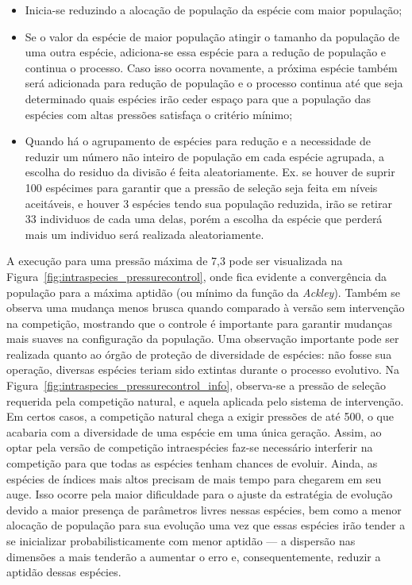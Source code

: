 \begin{itemize}
\item Inicia-se reduzindo a alocação de população da espécie com maior
população;
\item Se o valor da espécie de maior população atingir o tamanho da
população de uma outra espécie, adiciona-se essa espécie para a
redução de população e continua o processo. Caso isso ocorra
novamente, a próxima espécie também será adicionada para redução de
população e o processo continua até que seja determinado quais
espécies irão ceder espaço para que a população das espécies com altas
pressões satisfaça o critério mínimo;
\item Quando há o agrupamento de espécies para redução e a
necessidade de reduzir um número não inteiro de população em cada
espécie agrupada, a escolha do residuo da divisão é feita
aleatoriamente. Ex. se houver de suprir 100 espécimes para garantir que
a pressão de seleção seja feita em níveis aceitáveis, e houver 3
espécies tendo sua população reduzida, irão se retirar 33 individuos de
cada uma delas, porém a escolha da espécie que perderá mais um
individuo será realizada aleatoriamente.
\end{itemize}

A execução para uma pressão máxima de 7,3 pode ser visualizada na
Figura~\ref{fig:intraspecies_pressurecontrol}, onde fica evidente a
convergência da população para a máxima aptidão (ou mínimo da função
da \emph{Ackley}). Também se observa uma mudança menos brusca quando
comparado à versão sem intervenção na competição, mostrando que o
controle é importante para garantir mudanças mais suaves na
configuração da população. Uma observação importante pode ser
realizada quanto ao órgão de proteção de diversidade de espécies: não
fosse sua operação, diversas espécies teriam sido extintas durante o
processo evolutivo. Na
Figura~\ref{fig:intraspecies_pressurecontrol_info}, observa-se a
pressão de seleção requerida pela competição natural, e aquela
aplicada pelo sistema de intervenção. Em certos casos, a competição
natural chega a exigir pressões de até 500, o que acabaria com a
diversidade de uma espécie em uma única geração. Assim, ao optar pela
versão de competição intraespécies faz-se necessário interferir na
competição para que todas as espécies tenham chances de evoluir.
Ainda, as espécies de índices mais altos precisam de mais tempo para
chegarem em seu auge. Isso ocorre pela maior dificuldade para o ajuste
da estratégia de evolução devido a maior presença de parâmetros livres
nessas espécies, bem como a menor alocação de população para sua
evolução uma vez que essas espécies irão tender a se inicializar
probabilisticamente com menor aptidão --- a dispersão nas dimensões a
mais tenderão a aumentar o erro e, consequentemente, reduzir a aptidão
dessas espécies.

